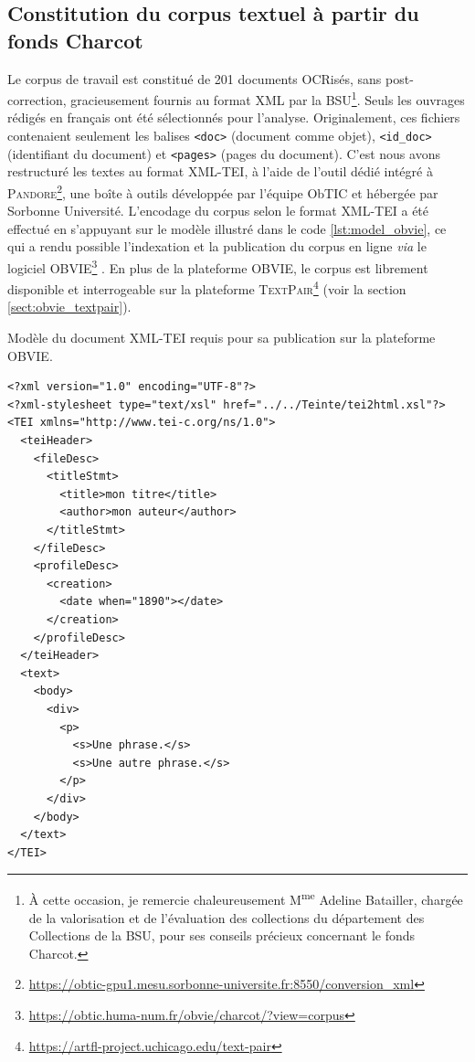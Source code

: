 \subsection{Constitution du corpus textuel à partir du fonds Charcot}
Le corpus de travail est constitué de 201 documents OCRisés, sans post-correction, gracieusement fournis au format \textsc{XML} par la \textsc{BSU}\footnote{À cette occasion, je remercie chaleureusement M\textsuperscript{me} Adeline Batailler, chargée de la valorisation et de l'évaluation des collections du département des Collections de la \textsc{BSU}, pour ses conseils précieux concernant le fonds Charcot.}. Seuls les ouvrages rédigés en français ont été sélectionnés pour l'analyse. Originalement, ces fichiers contenaient seulement les balises \texttt{<doc>} (document comme objet), \texttt{<id\_doc>} (identifiant du document) et \texttt{<pages>} (pages du document). C'est  nous avons restructuré les textes au format \textsc{XML-TEI}, à l'aide de l’outil dédié intégré à \textsc{Pandore}\footnote{\url{https://obtic-gpu1.mesu.sorbonne-universite.fr:8550/conversion_xml}}, une boîte à outils développée par l'équipe ObTIC et hébergée par Sorbonne Université. L'encodage du corpus selon le format \textsc{XML-TEI} a été effectué en s'appuyant sur le modèle illustré dans le code \ref{lst:model_obvie}, ce qui a rendu possible l'indexation et la publication du corpus en ligne \textit{via} le logiciel \textsc{OBVIE}\footnote{\url{https://obtic.huma-num.fr/obvie/charcot/?view=corpus}} \citep{alrahabi2022obvie}. En plus de la plateforme \textsc{OBVIE}, le corpus est librement disponible et interrogeable sur la plateforme \textsc{TextPair}\footnote{\url{https://artfl-project.uchicago.edu/text-pair}} (voir la section \ref{sect:obvie_textpair}).
\begin{listing}[h]
	\caption{Modèle du document \textsc{XML-TEI} requis pour sa publication sur la plateforme \textsc{OBVIE}.}
	\label{lst:model_obvie}
\begin{verbatim}
<?xml version="1.0" encoding="UTF-8"?>
<?xml-stylesheet type="text/xsl" href="../../Teinte/tei2html.xsl"?>
<TEI xmlns="http://www.tei-c.org/ns/1.0">
  <teiHeader>
    <fileDesc>
      <titleStmt>
        <title>mon titre</title>
        <author>mon auteur</author>
      </titleStmt>
    </fileDesc>
    <profileDesc>
      <creation>
        <date when="1890"></date>
      </creation>
    </profileDesc>
  </teiHeader>
  <text>
    <body>
      <div>
        <p>
          <s>Une phrase.</s>
          <s>Une autre phrase.</s>
        </p>
      </div>
    </body>
  </text>
</TEI>
\end{verbatim}
\end{listing}


